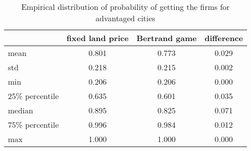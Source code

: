 \begin{table}[H]
\centering
\caption{Empirical distribution of probability of getting the firms for advantaged cities}
\label{table: allocation_efficiency}
\begin{tabular}{lccc}
\toprule
 & fixed land price & Bertrand game & difference \\
\midrule
mean & 0.801 & 0.773 & 0.029 \\
std & 0.218 & 0.215 & 0.002 \\
min & 0.206 & 0.206 & 0.000 \\
25\% percentile & 0.635 & 0.601 & 0.035 \\
median & 0.895 & 0.825 & 0.071 \\
75\% percentile & 0.996 & 0.984 & 0.012 \\
max & 1.000 & 1.000 & 0.000 \\
\bottomrule
\end{tabular}
\end{table}
